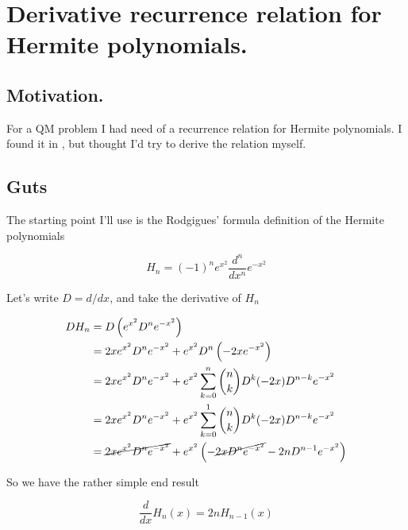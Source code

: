 
%

\chapter{Derivative recurrence relation for Hermite polynomials.}
\label{chap:hermiteDerivativeRecurranceRelation}
{}
\date{Jan 3, 2012}

\beginArtNoToc

\section{Motivation.}

For a QM problem I had need of a recurrence relation for Hermite polynomials.  I found it in \cite{abramowitz1964handbook}, but thought I'd try to derive the relation myself.

\section{Guts}

The starting point I'll use is the Rodgigues' formula definition of the Hermite polynomials

\begin{equation}\label{eqn:hermiteDerivativeRecurranceRelation:10}
H_n = (-1)^n e^{x^2} \frac{d^n}{dx^n} e^{-x^2}
\end{equation}

Let's write $D = d/dx$, and take the derivative of $H_n$

\begin{align*}
D H_n 
&= D \left( e^{x^2} D^n e^{-x^2} \right) \\
&= 
2 x e^{x^2} D^n e^{-x^2} 
+ e^{x^2} D^n \left( - 2 x e^{-x^2} \right) \\
&= 
2 x e^{x^2} D^n e^{-x^2} 
+ e^{x^2} \sum_{k=0}^n \binom{n}{k} D^k (-2 x) D^{n-k} e^{-x^2} \\
&= 
2 x e^{x^2} D^n e^{-x^2} 
+ e^{x^2} \sum_{k=0}^1 \binom{n}{k} D^k (-2 x) D^{n-k} e^{-x^2} \\
&= 
\cancel{2 x e^{x^2} D^n e^{-x^2} }
+ e^{x^2} \left(
-\cancel{2 x D^{n} e^{-x^2} }
- 2 n D^{n-1} e^{-x^2} 
\right) 
\end{align*}

So we have the rather simple end result

\begin{equation}\label{eqn:hermiteDerivativeRecurranceRelation:30}
\frac{d}{dx} H_n(x)
=
2 n H_{n-1}(x)
\end{equation}

\EndArticle
